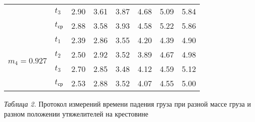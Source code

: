 \begin{center}
\begin{tabular}{|p{2.3cm}|p{0.5cm}|p{1.5cm}|p{1.5cm}|p{1.5cm}|p{1.5cm}|p{1.5cm}|p{1.5cm}|}
        \cline{2-8}
        & $t_3$ &       2.90        &    3.61     &     3.87    &     4.68    &    5.09     &    5.84     \\
        \cline{2-8}
        & $t_\text{ср}$ &      2.88       &    3.58    &    3.93     &    4.58     &   5.22     &     5.86    \\
        \hline
        \multirow{4}{*}{$m_4 = 0.927$} & $t_1$ &      2.39        &     2.86    &     3.55    &    4.20     &    4.39     &     4.90    \\
        \cline{2-8}
        & $t_2$ &       2.50        &    2.92     &    3.52     &    3.89     &    4.67     &    4.98     \\
        \cline{2-8}
        & $t_3$ &       2.70        &    2.85     &    3.48     &    4.12     &    4.59     &     5.12    \\
        \cline{2-8}
        & $t_\text{ср}$ &      2.53        &    2.88     &     3.52    &    4.07     &    4.55     &     5.00    \\
        \hline

    \end{tabular}

    \smallvspace

    \textit{Таблица 2.} Протокол измерений времени падения груза при разной
    массе груза и разном положении утяжелителей на крестовине
\end{center}
